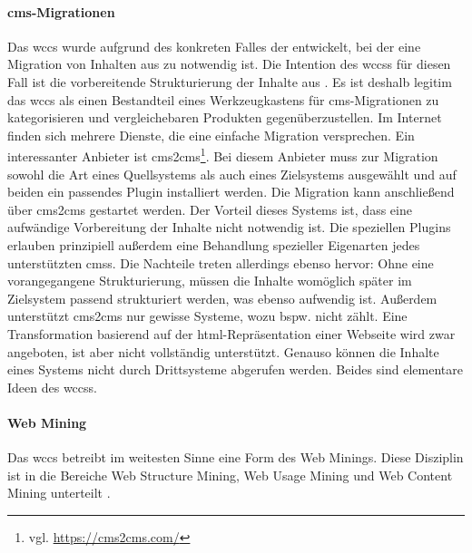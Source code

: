         \paragraph{\gls{cms}-Migrationen}
        Das \gls{wccs} wurde aufgrund des konkreten Falles der {\fernUni}
        entwickelt, bei der eine Migration von Inhalten aus {\wordpress} zu {\imperia} notwendig ist.
        Die Intention des \glspl{wccs} für diesen Fall ist die vorbereitende Strukturierung der
        Inhalte aus {\wordpress}.
        Es ist deshalb legitim das \gls{wccs} als einen Bestandteil eines Werkzeugkastens
        für \gls{cms}-Migrationen zu kategorisieren und vergleichebaren Produkten gegenüberzustellen.
        Im Internet finden sich mehrere Dienste, die eine einfache Migration versprechen.
        Ein interessanter Anbieter ist cms2cms\footnote{vgl. \url{https://cms2cms.com/}}.
        Bei diesem Anbieter muss zur Migration sowohl die Art eines Quellsystems als auch eines Zielsystems ausgewählt
        und auf beiden ein passendes Plugin installiert werden.
        Die Migration kann anschließend über cms2cms gestartet werden.
        Der Vorteil dieses Systems ist,
        dass eine aufwändige Vorbereitung der Inhalte nicht notwendig ist.
        Die speziellen Plugins erlauben prinzipiell außerdem eine Behandlung spezieller
        Eigenarten jedes unterstützten \glspl{cms}.
        Die Nachteile treten allerdings ebenso hervor: Ohne eine vorangegangene Strukturierung,
        müssen die Inhalte womöglich später im Zielsystem passend strukturiert werden,
        was ebenso aufwendig ist.
        Außerdem unterstützt cms2cms nur gewisse Systeme,
        wozu {\imperia} bspw. nicht zählt.
        Eine Transformation basierend auf der \gls{html}-Repräsentation einer Webseite wird zwar angeboten,
        ist aber nicht vollständig unterstützt.
        Genauso können die Inhalte eines Systems nicht durch Drittsysteme abgerufen werden.
        Beides sind elementare Ideen des \glspl{wccs}.

        \paragraph{Web Mining}
        Das \gls{wccs} betreibt im weitesten Sinne eine Form des Web Minings.
        Diese Disziplin ist in die Bereiche Web Structure Mining,
        Web Usage Mining und Web Content Mining unterteilt
        \cite{markov:webMining}.

